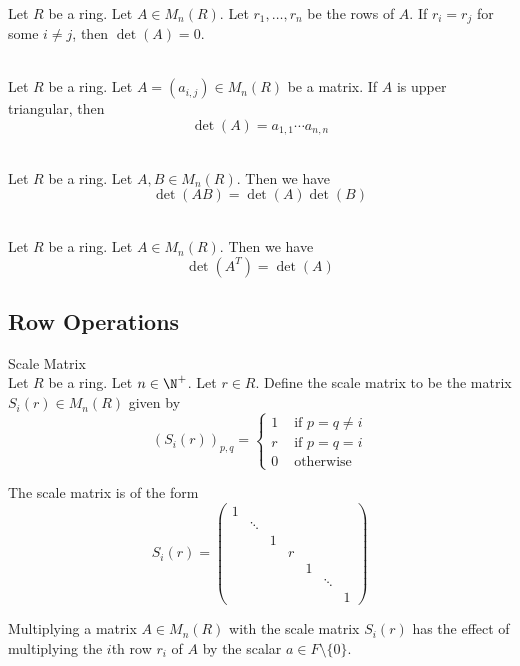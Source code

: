 \documentclass[a4paper]{article}
\begin{document}
\begin{prp}{}{}\\
Let $R$ be a ring. Let $A\in M_n(R)$. Let $r_1,\dots,r_n$ be the rows of $A$. If $r_i=r_j$ for some $i\neq j$, then $\det(A)=0$. 
\end{prp}

\begin{prp}{}{}\\
Let $R$ be a ring. Let $A=(a_{i,j})\in M_n(R)$ be a matrix. If $A$ is upper triangular, then $$\det(A)=a_{1,1}\cdots a_{n,n}$$
\end{prp}

\begin{prp}{}{}\\
Let $R$ be a ring. Let $A,B\in M_n(R)$. Then we have $$\det(AB)=\det(A)\det(B)$$
\end{prp}

\begin{prp}{}{}\\
Let $R$ be a ring. Let $A\in M_n(R)$. Then we have $$\det(A^T)=\det(A)$$
\end{prp}

\subsection{Row Operations}
\begin{defn}{Scale Matrix}{}\\
Let $R$ be a ring. Let $n\in\N^+$. Let $r\in R$. Define the scale matrix to be the matrix $S_i(r)\in M_n(R)$ given by $$\left(S_i(r)\right)_{p,q}=\begin{cases}
1 & \text{ if }p=q\neq i\\
r & \text{ if }p=q=i\\
0 & \text{ otherwise }
\end{cases}$$
\end{defn}

The scale matrix is of the form $$S_i(r)=
\begin{pmatrix}
1&&&&&&\\
&\ddots&&&&&\\
&&1&&&&\\
&&&r&&&\\
&&&&1&&\\
&&&&&\ddots&\\
&&&&&&1
\end{pmatrix}$$

Multiplying a matrix $A\in M_n(R)$ with the scale matrix $S_i(r)$ has the effect of multiplying the $i$th row $r_i$ of $A$ by the scalar $a\in F\setminus\{0\}$. 
\end{document}
